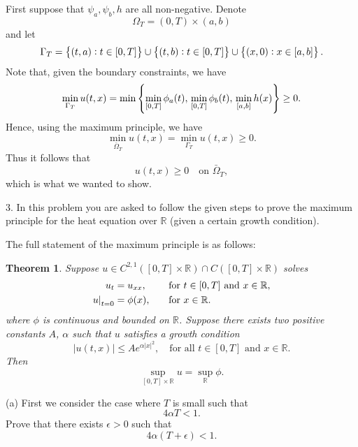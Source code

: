 \documentclass{article}
\newtheorem{theorem}{Theorem}
\begin{document}
First suppose that $\psi_a, \psi_b, h$ are all non-negative. Denote
\[\Omega_T = (0, T) \times (a, b)\] and let
%
\begin{equation*}
    \Gamma_T = \cbr{(t, a): t \in [0, T]}
                \cup \cbr{(t, b): t \in [0, T]}
                \cup \cbr{(x, 0): x \in [a, b]}
    .
\end{equation*}
%
Note that, given the boundary constraints, we have
%
\begin{equation*}
    \min_{\Gamma_T} u(t, x)
        = \min \cbr{
            \min_{[0, T]} \phi_a(t), \,
            \min_{[0, T]} \phi_b(t), \,
            \min_{[a, b]} h(x)
          }
        \geq 0
        .
\end{equation*}
%
Hence, using the maximum principle, we have
%
\begin{equation*}
    \min_{\bar{\Omega}_T} u(t, x) = \min_{\Gamma_T} u(t, x) \geq 0
    .
\end{equation*}
%
Thus it follows that
%
\begin{equation*}
    u(t, x) \geq 0 \quad \text{on } \bar{\Omega}_T
    ,
\end{equation*}
%
which is what we wanted to show.

\newpage

3. In this problem you are asked to follow the given steps to prove the
maximum principle for the heat equation over $\mathbb{R}$ (given a
certain growth condition).

The full statement of the maximum principle is as follows:
%
\begin{theorem}
    Suppose
    $u \in C^{2, 1} ([0, T] \times \mathbb{R}) \cap C([0, T] \times \mathbb{R})$
    solves
    \begin{alignat*}{2}
        u_t &= u_{xx}, &&\quad\text{for } t \in [0, T] \text{ and } x \in \mathbb{R}, \\
        \eval[0]{u}_{t = 0} &= \phi(x), &&\quad\text{for } x \in \mathbb{R}.
    \end{alignat*}
    where $\phi$ is continuous and bounded on $\mathbb{R}$. Suppose
    there exists two positive constants $A$, $\alpha$ such that $u$
    satisfies a growth condition
    \begin{equation*}
        |u(t, x)| \leq A e^{\alpha |x|^2},
        \quad \text{for all } t \in [0, T] \text{ and } x \in \mathbb{R}
        .
    \end{equation*}
    Then
    \begin{equation}
        \sup_{[0, T] \times \mathbb{R}} u = \sup_{\mathbb{R}} \phi
        .
        \label{eq:2-1}
    \end{equation}
\end{theorem}
%
(a) First we consider the case where $T$ is small such that
%
\begin{equation}
    4 \alpha T < 1
    .
    \label{eq:2-2}
\end{equation}
%
Prove that there exists $\epsilon > 0$ such that
%
\begin{equation*}
    4 \alpha (T + \epsilon) < 1
    .
\end{equation*}
\end{document}
